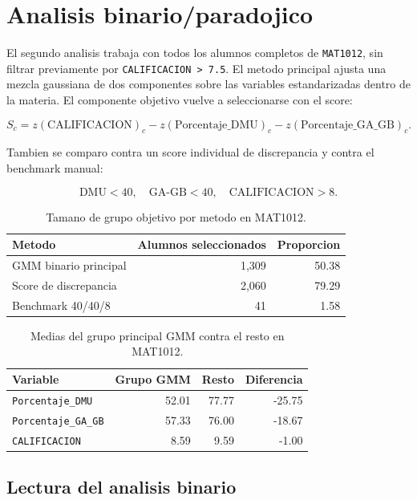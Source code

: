 \documentclass[11pt,letterpaper]{article}
\newcommand{\code}[1]{\texttt{#1}}
\begin{document}
\section{Analisis binario/paradojico}

El segundo analisis trabaja con todos los alumnos completos de \code{MAT1012}, sin filtrar previamente por \code{CALIFICACION > 7.5}. El metodo principal ajusta una mezcla gaussiana de dos componentes sobre las variables estandarizadas dentro de la materia. El componente objetivo vuelve a seleccionarse con el score:

\[
S_c =
z(\text{CALIFICACION})_c
- z(\text{Porcentaje\_DMU})_c
- z(\text{Porcentaje\_GA\_GB})_c.
\]

Tambien se comparo contra un score individual de discrepancia y contra el benchmark manual:

\[
\text{DMU} < 40,\quad \text{GA-GB} < 40,\quad \text{CALIFICACION} > 8.
\]

\begin{table}[H]
\centering
\caption{Tamano de grupo objetivo por metodo en MAT1012.}
\begin{tabular}{lrr}
\toprule
Metodo & Alumnos seleccionados & Proporcion \\
\midrule
GMM binario principal & 1,309 & 50.38 \\
Score de discrepancia & 2,060 & 79.29 \\
Benchmark 40/40/8 & 41 & 1.58 \\
\bottomrule
\end{tabular}
\end{table}

\begin{table}[H]
\centering
\caption{Medias del grupo principal GMM contra el resto en MAT1012.}
\begin{tabular}{lrrr}
\toprule
Variable & Grupo GMM & Resto & Diferencia \\
\midrule
\code{Porcentaje\_DMU} & 52.01 & 77.77 & -25.75 \\
\code{Porcentaje\_GA\_GB} & 57.33 & 76.00 & -18.67 \\
\code{CALIFICACION} & 8.59 & 9.59 & -1.00 \\
\bottomrule
\end{tabular}
\end{table}

\subsection{Lectura del analisis binario}
\end{document}

